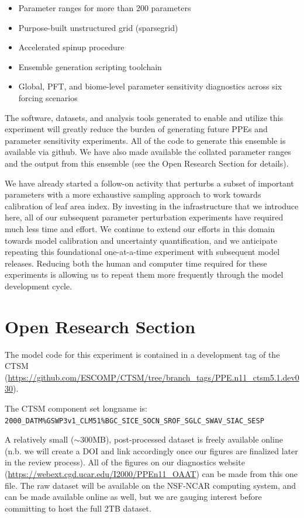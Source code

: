 \documentclass[draft]{agujournal2019}
\begin{document}
\begin{itemize}
\item Parameter ranges for more than 200 parameters
\item Purpose-built unstructured grid (sparsegrid)
\item Accelerated spinup procedure
\item Ensemble generation scripting toolchain
\item Global, PFT, and biome-level parameter sensitivity diagnostics across six forcing scenarios
\end{itemize} 

The software, datasets, and analysis tools generated to enable and utilize this experiment will greatly reduce the burden of generating future PPEs and parameter sensitivity experiments.
All of the code to generate this ensemble is available via github. We have also made available the collated parameter ranges and the output from this ensemble (see the Open Research Section for details).

We have already started a follow-on activity that perturbs a subset of important parameters with a more exhaustive sampling approach to work towards calibration of leaf area index. By investing in the infrastructure that we introduce here, all of our subsequent parameter perturbation experiments have required much less time and effort. We continue to extend our efforts in this domain towards model calibration and uncertainty quantification, and we anticipate repeating this foundational one-at-a-time experiment with subsequent model releases. Reducing both the human and computer time required for these experiments is allowing us to repeat them more frequently through the model development cycle.

\section*{Open Research Section}

The model code for this experiment is contained in a development tag of the CTSM (\url{https://github.com/ESCOMP/CTSM/tree/branch_tags/PPE.n11_ctsm5.1.dev030}).

The CTSM component set longname is: \\ \texttt{2000\_DATM\%GSWP3v1\_CLM51\%BGC\_SICE\_SOCN\_SROF\_SGLC\_SWAV\_SIAC\_SESP}

A relatively small ($\sim$300MB), post-processed dataset is freely available online (n.b. we will create a DOI and link accordingly once our figures are finalized later in the review process). All of the figures on our diagnostics website (\url{https://webext.cgd.ucar.edu/I2000/PPEn11_OAAT}) can be made from this one file. The raw dataset will be available on the NSF-NCAR computing system, and can be made available online as well, but we are gauging interest before committing to host the full 2TB dataset.
\end{document}
